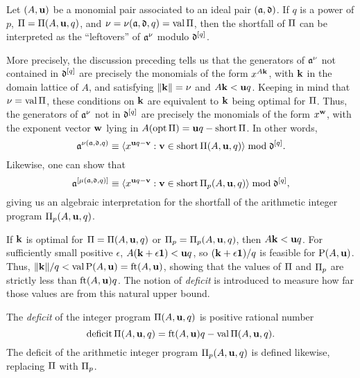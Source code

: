 \documentclass{amsart}
\begin{document}
\begin{remark}
\label{shortfall motivation: R}
Let $(A,\mathbf{u})$ be a monomial pair associated to an ideal pair $(\mathfrak{a},\mathfrak{d})$.
If $q$ is a power of $p$, $\Pi = \Pi(A,\mathbf{u},q)$, and $\nu = \nu(\mathfrak{a},\mathfrak{d},q) = \operatorname{val} \Pi$, then the shortfall of $\Pi$ can be interpreted as the ``leftovers'' of $\mathfrak{a}^\nu$ modulo $\mathfrak{d}^{[q]}$.

More precisely, the discussion preceding  tells us that the generators of $\mathfrak{a}^{\nu}$ not contained in $\mathfrak{d}^{[q]}$ are precisely the monomials of the form $x^{A \mathbf{k}}$, with $\mathbf{k}$ in the domain lattice of $A$, and satisfying $\| \mathbf{k} \| = \nu$ and $A\mathbf{k}<\mathbf{u}q$.
Keeping in mind that $\nu= \operatorname{val} \Pi$, these conditions on $\mathbf{k}$ are equivalent to $\mathbf{k}$ being optimal for $\Pi$.
Thus, the generators of $\mathfrak{a}^{\nu}$ not in $\mathfrak{d}^{[q]}$ are precisely the monomials of the form $x^{\mathbf{w}}$, with the exponent vector $\mathbf{w}$ lying in $A(\operatorname{opt} \Pi) = \mathbf{u}q - \operatorname{short} \Pi$.
In other words,
\begin{equation}
\label{algebraic shortfall PI general: e}
 \mathfrak{a}^{\nu(\mathfrak{a}, \mathfrak{d}, q)} \equiv \langle x^{\mathbf{u}q-\mathbf{v}}: \mathbf{v} \in \operatorname{short} \Pi(A,\mathbf{u},q) \rangle \bmod \mathfrak{d}^{[q]}.
 \end{equation}
Likewise, one can show that
\begin{equation}
\label{algebraic shortfall PI_p general: e}
\mathfrak{a}^{[\mu(\mathfrak{a}, \mathfrak{d}, q)]} \equiv \langle x^{\mathbf{u}q-\mathbf{v}}: \mathbf{v} \in \operatorname{short} \Pi_p(A,\mathbf{u},q) \rangle \bmod \mathfrak{d}^{[q]},
\end{equation}
giving us an algebraic interpretation for the shortfall of the arithmetic integer program $\Pi_p(A,\mathbf{u},q)$.
\end{remark}

If $\mathbf{k}$ is optimal for $\Pi = \Pi(A,\mathbf{u},q)$ or $\Pi_p = \Pi_p(A,\mathbf{u},q)$, then $A\mathbf{k} < \mathbf{u}q$.
For sufficiently small positive $\epsilon$, $A(\mathbf{k}+\epsilon\mathbf{1}) < \mathbf{u}q$, so $(\mathbf{k}+\epsilon \mathbf{1})/q$ is feasible for $\mathrm{P}(A,\mathbf{u})$.
Thus, $\| \mathbf{k} \|/q < \operatorname{val} \mathrm{P}(A,\mathbf{u}) = \operatorname{ft}(A, \mathbf{u})$, showing that the values of $\Pi$ and $\Pi_p$ are strictly less than $\operatorname{ft}(A, \mathbf{u})q$.
The notion of \emph{deficit} is introduced to measure how far those values are from this natural upper bound.

\begin{definition}
   The \emph{deficit} of the integer program $\Pi(A, \mathbf{u}, q)$ is positive rational number
   \[ \operatorname{deficit} \Pi(A, \mathbf{u}, q) = \operatorname{ft}(A, \mathbf{u})q - \operatorname{val} \Pi(A, \mathbf{u}, q).\]
   The deficit of the arithmetic integer program $\Pi_p(A, \mathbf{u}, q)$ is defined likewise, replacing $\Pi$ with $\Pi_p$.
\end{definition}
\end{document}
